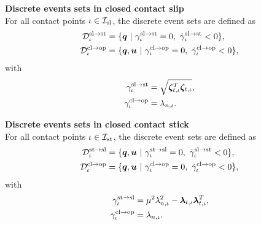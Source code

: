 \documentclass[../DC2017114Bouma.tex]{subfiles}
\begin{document}
\textbf{Discrete events sets in closed contact slip}\\
For all contact points $\iota\in\mathcal{I}_{\text{sl}}$, the discrete event sets are defined as
\begin{align}
\mathcal{D}^{\text{sl}\rightarrow\text{st}}_{\iota} &= \{ \qb\ |\ \gamma^{\text{sl}\rightarrow\text{st}}_{\iota} = 0,\ \dot{\gamma}^{\text{sl}\rightarrow\text{st}}_{\iota} < 0\},\label{eq:2Dslst}\\
\mathcal{D}^{\text{cl}\rightarrow\text{op}}_{\iota} &= \{ \qb,\ub\ |\ \gamma^{\text{cl}\rightarrow\text{op}}_{\iota} = 0,\ \dot{\gamma}^{\text{cl}\rightarrow\text{op}}_{\iota} < 0\},\label{eq:2Dslop}
\end{align}
with 
\begin{align}
\gamma^{\text{sl}\rightarrow\text{st}}_{\iota} &= \sqrt{\boldsymbol{\zeta}_{t,\iota}^T\boldsymbol{\zeta}_{t,\iota}},\\
\gamma^{\text{cl}\rightarrow\text{op}}_{\iota} &= \lambda_{n,\iota}.
\end{align}

\textbf{Discrete events sets in closed contact stick}\\
For all contact points $\iota\in\mathcal{I}_{\text{st}}$, the discrete event sets are defined as
\begin{align}
\mathcal{D}^{\text{st}\rightarrow\text{sl}}_{\iota} &= \{ \qb,\ub\ |\ \gamma^{\text{st}\rightarrow\text{sl}}_{\iota} = 0,\ \dot{\gamma}^{\text{sl}\rightarrow\text{st}}_{\iota} < 0\},\label{eq:2Dstsl}\\
\mathcal{D}^{\text{cl}\rightarrow\text{op}}_{\iota} &= \{ \qb,\ub\ |\ \gamma^{\text{cl}\rightarrow\text{op}}_{\iota} = 0,\ \dot{\gamma}^{\text{cl}\rightarrow\text{op}}_{\iota} < 0\},\label{eq:2Dstop}
\end{align}
with 
\begin{align}
\gamma^{\text{st}\rightarrow\text{sl}}_{\iota} &= \mu^2\lambda_{n,\iota}^2-\boldsymbol{\lambda}_{t,\iota}\boldsymbol{\lambda}_{t,\iota}^T,\\
\gamma^{\text{cl}\rightarrow\text{op}}_{\iota} &= \lambda_{n,\iota}.
\end{align}
\end{document}
